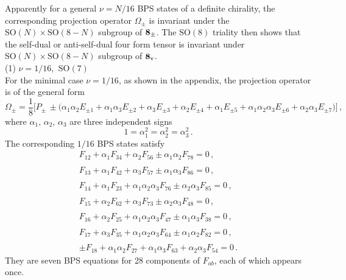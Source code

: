 \documentclass[a4paper,11pt]{article}
\def\salpha{{\alpha}}
\begin{document}
Apparently for a general $\nu=N/16$ BPS states of a definite chirality, the corresponding projection operator $\Omega_{\pm}$ is invariant under the
$\mbox{SO}(N)\times\mbox{SO}(8-N)$ subgroup of ${\bf 8}_{\pm}$. The $\mbox{SO}(8)$ triality then shows that the self-dual or
anti-self-dual four form tensor is invariant under $\mbox{SO}(N)\times\mbox{SO}(8-N)$ subgroup of ${\bf 8}_{{\rm v}}$.\\



(1) $\nu=1/16$,  $~\mbox{SO}(7)$\\
For the minimal  case $\nu=1/16$, as shown in the appendix,  the projection operator is of the general form
\begin{equation}
\Omega_{\pm}=\frac{1}{8}\bigg[P_{\pm}\,\pm\big(\salpha_{1}\salpha_{2}E_{\pm 1}+\salpha_{1}\salpha_{3}E_{\pm
2}+\salpha_{3}E_{\pm 3}+\salpha_{2}E_{\pm 4}+\salpha_{1}E_{\pm 5}+\salpha_{1}\salpha_{2}\salpha_{3}E_{\pm
6}+\salpha_{2}\salpha_{3}E_{\pm 7}\big)\bigg]\,, \label{P1/16}
\end{equation}
where  $\alpha_{1},\,\alpha_{2},\,\alpha_{3}$ are  three independent signs
\begin{equation}
1=\alpha_{1}^{2}=\alpha_{2}^{2}=\alpha_{3}^{2}\,.
\end{equation}
The corresponding  ${1/16}$ BPS states satisfy
\begin{equation}
\begin{array}{l}
F_{12}+\salpha_{1}F_{34}+\salpha_{2}F_{56}\pm\salpha_{1}\salpha_{2}F_{78}=0\,,\\{}\\
F_{13}+\salpha_{1}F_{42}+\salpha_{3}F_{57}\pm\salpha_{1}\salpha_{3}F_{86}=0\,,\\ {}\\
F_{14}+\salpha_{1}F_{23}+\salpha_{1}\salpha_{2}\salpha_{3}F_{76}\pm\salpha_{2}\salpha_{3}F_{85}=0\,,\\{}\\
F_{15}+\salpha_{2}F_{62}+\salpha_{3}F_{73}\pm\salpha_{2}\salpha_{3}F_{48}=0\,,\\{}\\
F_{16}+\salpha_{2}F_{25}+\salpha_{1}\salpha_{2}\salpha_{3}F_{47}\pm\salpha_{1}\salpha_{3}F_{38}=0\,,\\{}\\
F_{17}+\salpha_{3}F_{35}+\salpha_{1}\salpha_{2}\salpha_{3}F_{64}\pm\salpha_{1}\salpha_{2}F_{82}=0\,,\\{}\\
\pm F_{18}+\salpha_{1}\salpha_{2}F_{27}+\salpha_{1}\salpha_{3}F_{63}+\salpha_{2}\salpha_{3}F_{54}=0\,. \label{octobps}
\end{array}
\end{equation}
They are seven BPS equations for 28 components of $F_{ab}$, each of which appears once.
\end{document}
